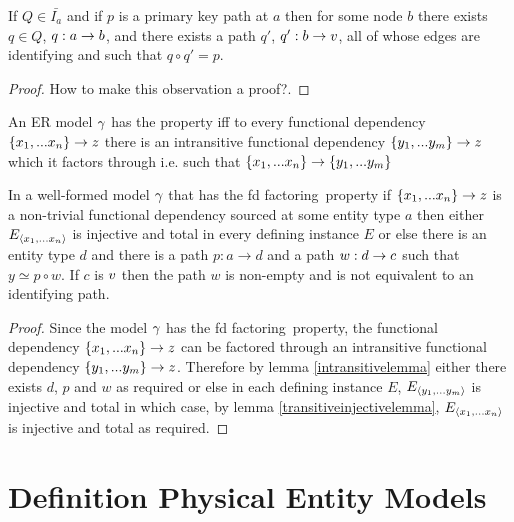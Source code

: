 \begin{lemma}
If $Q \in \bar{I_a}$ and if $p$ is a primary key path at $a$ then for some node $b$ there exists $q \in Q$, $q: a \rightarrow b$, and there exists 
a path $q'$, $q': b \rightarrow v$,  all of whose edges are identifying and such that $q \circ q' = p$. 
\end{lemma}
\begin{proof}
How to make this observation a proof?.
\end{proof}
\newcommand{\fdfactoring}{fd factoring}
\begin{definition}
\noindent An ER model $\gamma$ has the \term{\fdfactoring} property iff to every functional dependency $\left\{x_1,...x_n\right\} \rightarrow z$ there is an intransitive functional dependency $\left\{y_1,...y_m\right\} \rightarrow z$ which it factors through i.e. such that $\left\{x_1,...x_n\right\} \rightarrow \left\{y_1,...y_m\right\}$
\end{definition}
\begin{lemma}
\label{mainlemma}
In a well-formed model $\gamma$ that has the \fdfactoring\ property if $\{x_1,...x_n\} \rightarrow z$ is a non-trivial 
functional dependency sourced
at some entity type $a$ then either $E_{\langle x_1,...x_n\rangle}$ is injective and total in every defining instance $E$ 
or else there is an entity type $d$ and there is a path $p:a \rightarrow d$
and a  path $w:d \rightarrow c$  such that $y \simeq p \circ w$. If $c$ is $v$ then
the path $w$ is non-empty and is not equivalent to an identifying path.
\end{lemma}
\begin{proof}
Since the model $\gamma$  has the \fdfactoring\ property, the functional dependency $\left\{x_1,...x_n\right\} \rightarrow z$ can be factored through an intransitive functional
dependency $\left\{y_1,...y_m\right\} \rightarrow z$. Therefore by lemma \ref{intransitivelemma} either there exists $d$, $p$ and $w$ as required
or else in each defining instance $E$, $E_{\langle y_1,...y_m\rangle}$ is injective and total in which case, by lemma \ref{transitiveinjectivelemma}, $E_{\langle x_1,...x_n\rangle}$ is injective and total as required.
\end{proof}

\section{Definition Physical Entity Models}
	
